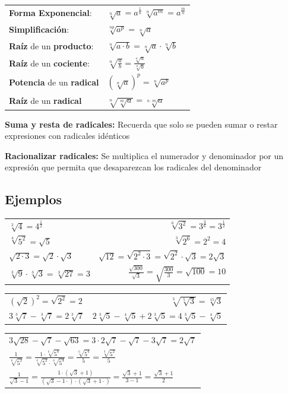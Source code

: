 \documentclass[a4paper,spanish,9pt]{extarticle}
\begin{document}
\begin{multicols*}{2}
\begin{tabular}{ll}
\textbf{Forma Exponencial}: & $\sqrt[n]{a}=a^\frac{1}{n} \ \sqrt[n]{a^m}=a^\frac{m}{n} $ \\
\textbf{Simplificación}: & $\sqrt[np]{a^p}=\sqrt[n]{a}$ \\
\textbf{Raíz} de un \textbf{producto}: & $\sqrt[n]{a\cdot b}=\sqrt[n]{a}\cdot\sqrt[n]{b}$ \\
\textbf{Raíz} de un \textbf{cociente}: & $\sqrt[n]{\frac{a}{b}}=\frac{\sqrt[n]{a}}{\sqrt[n]{b}}$ \\
\textbf{Potencia} de un \textbf{radical} & $\left(\sqrt[n]{a}\right)^p=\sqrt[n]{a^p}$ \\
\textbf{Raíz} de un \textbf{radical} & $\sqrt[n]{\sqrt[m]{a}}=\sqrt[n\cdot m]{a}$ \\
\end{tabular}

\vspace{0.5cm}
\textbf{Suma y resta de radicales:} Recuerda que solo se pueden sumar o restar expresiones con radicales idénticos

\vspace{0.5cm}
\textbf{Racionalizar radicales:} Se multiplica el numerador y denominador por un expresión que permita que desaparezcan los radicales del denominador

\subsection{Ejemplos}
\begin{tabular}{lr}
$\sqrt[2]{4}=4^\frac{1}{2}$ & $\sqrt[6]{3^2}=3^\frac{3}{6}=3^\frac{1}{2}$ \\
$\sqrt[4]{5^2}=\sqrt{5}$ & $\sqrt[3]{2^6}=2^2=4$\\
$\sqrt{2\cdot 3}=\sqrt{2}\cdot\sqrt{3}$ & $\sqrt{12}=\sqrt{2^2\cdot 3}=\sqrt{2^2}\cdot\sqrt{3}=2\sqrt{3}$\\ 
$\sqrt[3]{9}\cdot\sqrt[3]{3}=\sqrt[3]{27}=3$ & $\frac{\sqrt{300}}{\sqrt{3}}=\sqrt{\frac{300}{3}}=\sqrt{100}=10$
\end{tabular}

\begin{tabular}{lr}
$\left(\sqrt{2}\right)^2=\sqrt{2^2}=2$ & $\sqrt[3]{\sqrt[5]{3}}=\sqrt[15]{3}$\\
$3\sqrt[3]{7}-\sqrt[3]{7}=2\sqrt[3]{7}$ & $2\sqrt[3]{5}-\sqrt[4]{5}+2\sqrt[3]{5}=4\sqrt[3]{5}-\sqrt[4]{5}$
\end{tabular}

\begin{tabular}{l}
$3\sqrt{28}-\sqrt{7}-\sqrt{63}=3\cdot 2\sqrt{7}-\sqrt{7}-3\sqrt{7}=2\sqrt{7}$ \\
$\frac{1}{\sqrt[6]{5^2}}=\frac{1\cdot \sqrt[6]{5^4}}{\sqrt[6]{5^2}\cdot \sqrt[6]{5^4}}=\frac{\sqrt[6]{5^4}}{5}=\frac{\sqrt[3]{5^2}}{5}$  \\
$\frac{1}{\sqrt{3}-1}=\frac{1 \cdot \left(\sqrt{3}+1\right)}{\left(\sqrt{3}-1 \cdot \right)\cdot \left(\sqrt{3}+1\cdot \right)}=\frac{\sqrt{3}+1}{3-1}=\frac{\sqrt{3}+1}{2}$
\end{tabular}


\end{multicols*}
\end{document}
